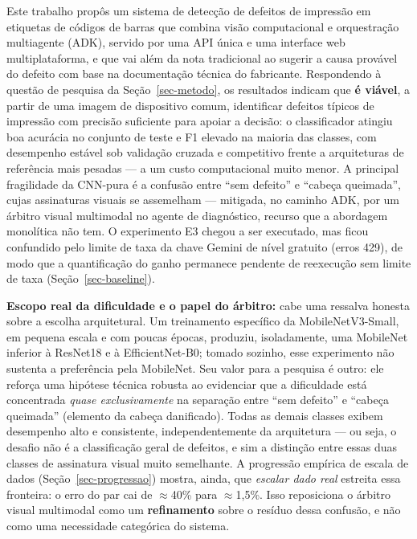 \documentclass[
	article,			%
	11pt,				%
	oneside,			%
	a4paper,			%
	english,			%
	brazilian,			%
	sumario=tradicional
	]{abntex2}
\begin{document}
Este trabalho propôs um sistema de detecção de defeitos de impressão em etiquetas
de códigos de barras que combina visão computacional e orquestração multiagente
(ADK), servido por uma API única e uma interface web multiplataforma, e que vai
além da nota tradicional ao sugerir a causa provável do defeito com base na
documentação técnica do fabricante. Respondendo à questão de pesquisa da
Seção~\ref{sec-metodo}, os resultados indicam que \textbf{é viável}, a partir de uma
imagem de dispositivo comum, identificar defeitos típicos de impressão com precisão
suficiente para apoiar a decisão: o classificador atingiu boa acurácia no conjunto
de teste e F1 elevado na maioria das classes, com desempenho estável sob validação
cruzada e competitivo frente a arquiteturas de referência mais pesadas --- a um custo
computacional muito menor. A principal fragilidade da CNN-pura é a confusão entre
``sem defeito'' e ``cabeça queimada'', cujas assinaturas visuais se assemelham ---
mitigada, no caminho ADK, por um árbitro visual multimodal no agente de diagnóstico,
recurso que a abordagem monolítica não tem. O experimento E3 chegou a ser executado,
mas ficou confundido pelo limite de taxa da chave Gemini de nível gratuito
(erros 429), de modo que a quantificação do ganho permanece pendente de reexecução
sem limite de taxa (Seção~\ref{sec-baseline}).

\noindent\textbf{Escopo real da dificuldade e o papel do árbitro:} cabe uma
ressalva honesta sobre a escolha arquitetural. Um treinamento específico da
MobileNetV3-Small, em pequena escala e com poucas épocas, produziu, isoladamente,
uma MobileNet inferior à ResNet18 e à EfficientNet-B0; tomado sozinho, esse
experimento não sustenta a preferência pela MobileNet. Seu valor para a pesquisa é
outro: ele reforça uma hipótese técnica robusta ao evidenciar que a dificuldade
está concentrada \emph{quase exclusivamente} na separação entre ``sem defeito'' e
``cabeça queimada'' (elemento da cabeça danificado). Todas as demais classes
exibem desempenho alto e consistente, independentemente da arquitetura --- ou
seja, o desafio não é a classificação geral de defeitos, e sim a distinção entre
essas duas classes de assinatura visual muito semelhante. A progressão empírica de
escala de dados (Seção~\ref{sec-progressao}) mostra, ainda, que \emph{escalar dado
real} estreita essa fronteira: o erro do par cai de $\approx$40\% para
$\approx$1,5\%. Isso reposiciona o árbitro visual multimodal como um
\textbf{refinamento} sobre o resíduo dessa confusão, e não como uma necessidade
categórica do sistema.
\end{document}
